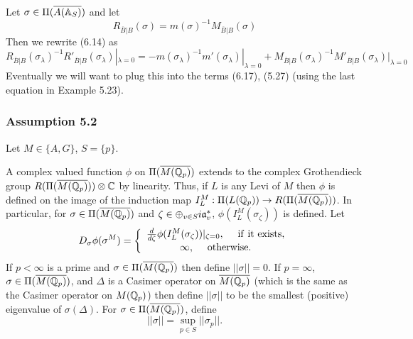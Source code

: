 Let $\sigma\in \Pi(\overline{A({\Bbb{A}}_S)})$ and let
\[
R_{\overline{B}|B}(\sigma)
=m(\sigma)^{-1}M_{\overline{B}|B}(\sigma)
\]
Then we rewrite (6.14) as 
\[
R_{\overline{B}|B}(\sigma_\lambda)^{-1}
R'_{\overline{B}|B}(\sigma_\lambda)|_{\lambda =0}
=-m(\sigma_\lambda)^{-1}m'(\sigma_\lambda)|_{\lambda =0}
+M_{\overline{B}|B}(\sigma_\lambda)^{-1}
M'_{\overline{B}|B}(\sigma_\lambda)|_{\lambda =0}
\]
Eventually we will want to plug this into the terms (6.17),
(5.27) (using the last equation in Example 5.23). 

\subsubsection{Assumption 5.2}

Let $M\in \{A,G\}$, $S=\{p\}$.

A complex valued function $\phi$ on
$\Pi(\overline{M({\Bbb{Q}}_p)})$ extends to the
complex Grothendieck group
$R(\Pi(\overline{M({\Bbb{Q}}_p)}))\otimes {\Bbb{C}}$ by linearity.
Thus, if $L$ is any Levi of $M$ then $\phi$ is defined on the image of
the induction map
$I_L^M: \Pi(L({\Bbb{Q}}_p))\rightarrow R(\Pi(\overline{M({\Bbb{Q}}_p)}))$.
In particular, for $\sigma\in \Pi(\overline{M({\Bbb{Q}}_p)})$ and
$\zeta\in \oplus_{v\in S}i{\frak{a}}^*_v$, $\phi(I_L^M(\sigma_\zeta))$ is
defined. Let
\begin{equation}
D_\sigma \phi(\sigma^M)=
\left\{
\begin{array}{c}
{d\over d\zeta}\phi(I_L^M(\sigma_\zeta))|_{\zeta =0},
\ \ \ \ {\rm if\ it\ exists},\\
\infty,\ \ \ \ {\rm otherwise}.
\end{array}
\right.
\end{equation}
If $p<\infty$ is a prime and
$\sigma\in \Pi(\overline{M({\Bbb{Q}}_p)})$ then define
$||\sigma||=0$. If $p=\infty$,
$\sigma\in \Pi(\overline{M({\Bbb{Q}}_p)})$,
and $\Delta$
is a Casimer operator on $\overline{M({\Bbb{Q}}_p)}$
(which is the same as the Casimer operator on
$M({\Bbb{Q}}_p)$)
then define $||\sigma||$ to be the
smallest (positive) eigenvalue of $\sigma(\Delta)$. For
$\sigma\in \Pi(\overline{M({\Bbb{Q}}_p)})$, define
\[
||\sigma||=\sup_{p\in S}||\sigma_p||.
\]

